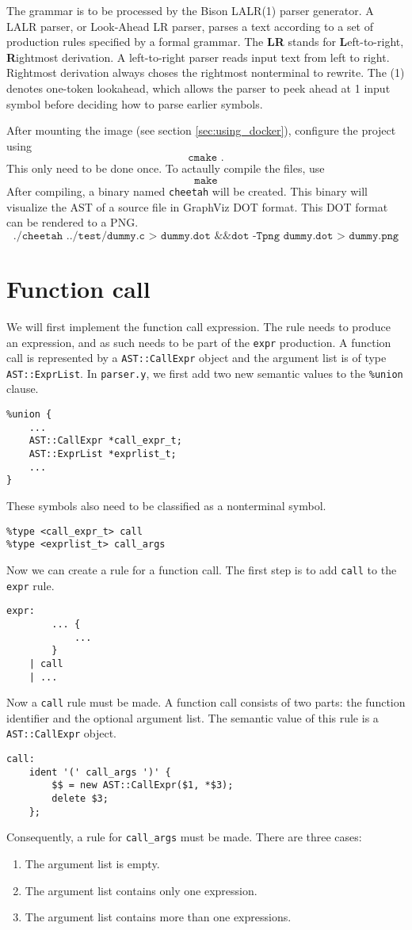 \documentclass{report}
\begin{document}
	The grammar is to be processed by the Bison LALR(1) parser generator. A LALR parser, or Look-Ahead LR parser, parses a text according to a set of production rules specified by a formal grammar. The \textbf{LR} stands for \textbf{L}eft-to-right, \textbf{R}ightmost derivation. A left-to-right parser reads input text from left to right. Rightmost derivation always choses the rightmost nonterminal to rewrite. The (1) denotes one-token lookahead, which allows the parser to peek ahead at 1 input symbol before deciding how to parse earlier symbols. 
	
	After mounting the image (see section \ref{sec:using_docker}), configure the project using 
	$$\texttt{cmake .}$$
	This only need to be done once. To actaully compile the files, use
	$$\texttt{make}$$
	After compiling, a binary named \texttt{cheetah} will be created. This binary will visualize the AST of a source file in GraphViz DOT format. This DOT format can be rendered to a PNG.
	$$\texttt{./cheetah ../test/dummy.c > dummy.dot \&\& dot -Tpng dummy.dot > dummy.png}$$ 
	\section{Function call}
	We will first implement the function call expression. The rule needs to produce an expression, and as such needs to be part of the \texttt{expr} production. A function call is represented by a \texttt{AST::CallExpr} object and the argument list is of type \texttt{AST::ExprList}. In \texttt{parser.y}, we first add two new semantic values to the \texttt{\%union} clause.
	\begin{lstlisting}
%union {
	...
	AST::CallExpr *call_expr_t;
	AST::ExprList *exprlist_t;
	...
}
	\end{lstlisting}
	These symbols also need to be classified as a nonterminal symbol.
	\begin{lstlisting}
%type <call_expr_t> call
%type <exprlist_t> call_args
	\end{lstlisting}
	
Now we can create a rule for a function call. The first step is to add \texttt{call} to the \texttt{expr} rule.
\begin{lstlisting}
expr:
	 	... {
	 		...
		}
	| call
	| ...
\end{lstlisting}
Now a \texttt{call} rule must be made. A function call consists of two parts: the function identifier and the optional argument list. The semantic value of this rule is a \texttt{AST::CallExpr} object. 
\begin{lstlisting}
call:
	ident '(' call_args ')' {
		$$ = new AST::CallExpr($1, *$3);
		delete $3;
	};
\end{lstlisting}
Consequently, a rule for \texttt{call\_args} must be made. There are three cases:
\begin{enumerate}
	\item The argument list is empty.
	\item The argument list contains only one expression.
	\item The argument list contains more than one expressions.
\end{enumerate}
\end{document}
